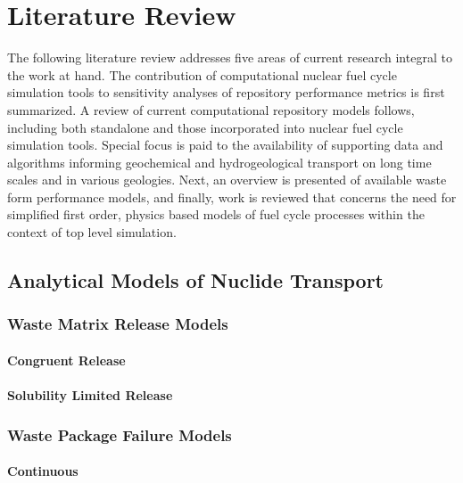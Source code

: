 \chapter{Literature Review}\label{chap:litrev}
The following literature review addresses five areas of current research integral to the work at 
hand. The contribution of computational nuclear fuel cycle simulation tools to sensitivity analyses 
of repository performance metrics is first summarized. A review of current computational repository 
models follows, including both standalone and those incorporated into nuclear fuel cycle simulation 
tools. Special focus is paid to the availability of supporting data and algorithms informing 
geochemical and hydrogeological transport on long time scales and in various geologies. Next, an 
overview is presented of available waste form performance models, and finally, work is reviewed that 
concerns the need for simplified first order, physics based models of fuel cycle processes within 
the context of top level simulation.  




\section{Analytical Models of Nuclide Transport}\label{sec:analytical_nuc}



\subsection{Waste Matrix Release Models}

\subsubsection{Congruent Release}

\subsubsection{Solubility Limited Release}



\subsection{Waste Package Failure Models}

\subsubsection{Continuous}

